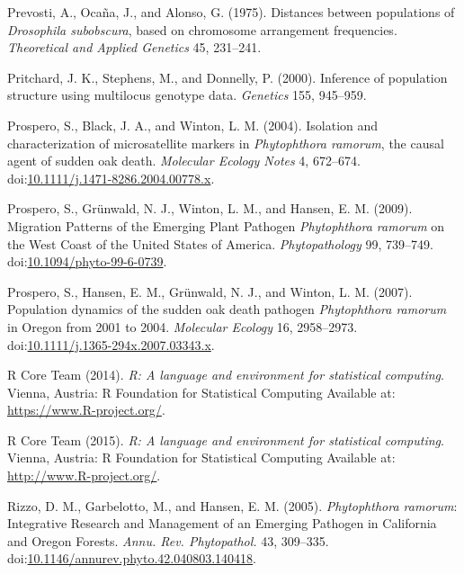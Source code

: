 \documentclass[double,12pt]{beavtex}
\begin{document}
  \hypertarget{ref-prevosti1975distances}{}
  Prevosti, A., Ocaña, J., and Alonso, G. (1975). Distances between
  populations of \emph{Drosophila subobscura}, based on chromosome
  arrangement frequencies. \emph{Theoretical and Applied Genetics} 45,
  231--241.
  
  \hypertarget{ref-pritchard2000inference}{}
  Pritchard, J. K., Stephens, M., and Donnelly, P. (2000). Inference of
  population structure using multilocus genotype data. \emph{Genetics}
  155, 945--959.
  
  \hypertarget{ref-prospero2004isolation}{}
  Prospero, S., Black, J. A., and Winton, L. M. (2004). Isolation and
  characterization of microsatellite markers in \emph{Phytophthora
  ramorum}, the causal agent of sudden oak death. \emph{Molecular Ecology
  Notes} 4, 672--674.
  doi:\href{https://doi.org/10.1111/j.1471-8286.2004.00778.x}{10.1111/j.1471-8286.2004.00778.x}.
  
  \hypertarget{ref-prospero2009migration}{}
  Prospero, S., Grünwald, N. J., Winton, L. M., and Hansen, E. M. (2009).
  Migration Patterns of the Emerging Plant Pathogen \emph{Phytophthora
  ramorum} on the West Coast of the United States of America.
  \emph{Phytopathology} 99, 739--749.
  doi:\href{https://doi.org/10.1094/phyto-99-6-0739}{10.1094/phyto-99-6-0739}.
  
  \hypertarget{ref-prospero2007population}{}
  Prospero, S., Hansen, E. M., Grünwald, N. J., and Winton, L. M. (2007).
  Population dynamics of the sudden oak death pathogen \emph{Phytophthora
  ramorum} in Oregon from 2001 to 2004. \emph{Molecular Ecology} 16,
  2958--2973.
  doi:\href{https://doi.org/10.1111/j.1365-294x.2007.03343.x}{10.1111/j.1365-294x.2007.03343.x}.
  
  \hypertarget{ref-R2014}{}
  R Core Team (2014). \emph{R: A language and environment for statistical
  computing}. Vienna, Austria: R Foundation for Statistical Computing
  Available at: \url{https://www.R-project.org/}.
  
  \hypertarget{ref-R}{}
  R Core Team (2015). \emph{R: A language and environment for statistical
  computing}. Vienna, Austria: R Foundation for Statistical Computing
  Available at: \url{http://www.R-project.org/}.
  
  \hypertarget{ref-rizzo2005phytophthora}{}
  Rizzo, D. M., Garbelotto, M., and Hansen, E. M. (2005).
  \emph{Phytophthora ramorum}: Integrative Research and Management of an
  Emerging Pathogen in California and Oregon Forests. \emph{Annu. Rev.
  Phytopathol.} 43, 309--335.
  doi:\href{https://doi.org/10.1146/annurev.phyto.42.040803.140418}{10.1146/annurev.phyto.42.040803.140418}.
  
\end{document}

